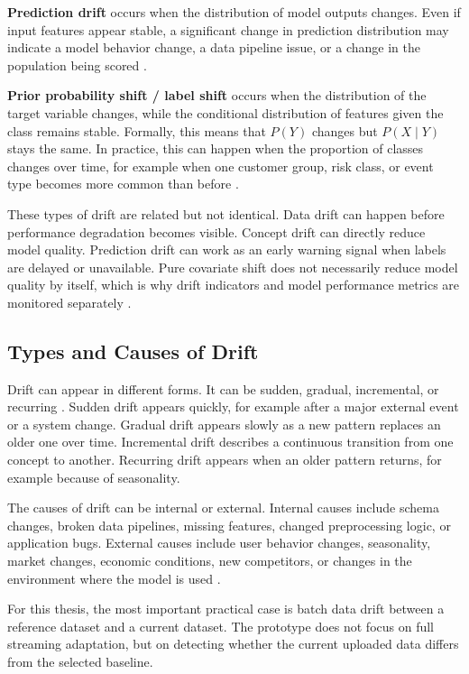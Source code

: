 \textbf{Prediction drift} occurs when the distribution of model outputs changes. Even if input features appear stable, a significant change in prediction distribution may indicate a model behavior change, a data pipeline issue, or a change in the population being scored \cite{MonitoringObservabilityMLSystems}.

\textbf{Prior probability shift / label shift} occurs when the distribution of the target variable changes, while the conditional distribution of features given the class remains stable. Formally, this means that $P(Y)$ changes but $P(X \mid Y)$ stays the same. In practice, this can happen when the proportion of classes changes over time, for example when one customer group, risk class, or event type becomes more common than before \cite{MorenoTorresDatasetShift2012}.

These types of drift are related but not identical. Data drift can happen before performance degradation becomes visible. Concept drift can directly reduce model quality. Prediction drift can work as an early warning signal when labels are delayed or unavailable. Pure covariate shift does not necessarily reduce model quality by itself, which is why drift indicators and model performance metrics are monitored separately \cite{MorenoTorresDatasetShift2012}.


\subsection{Types and Causes of Drift}

Drift can appear in different forms. It can be sudden, gradual, incremental, or recurring \cite{LearningUnderConceptDrift}. Sudden drift appears quickly, for example after a major external event or a system change. Gradual drift appears slowly as a new pattern replaces an older one over time. Incremental drift describes a continuous transition from one concept to another. Recurring drift appears when an older pattern returns, for example because of seasonality.

The causes of drift can be internal or external. Internal causes include schema changes, broken data pipelines, missing features, changed preprocessing logic, or application bugs. External causes include user behavior changes, seasonality, market changes, economic conditions, new competitors, or changes in the environment where the model is used \cite{MonitoringPerformance}.

For this thesis, the most important practical case is batch data drift between a reference dataset and a current dataset. The prototype does not focus on full streaming adaptation, but on detecting whether the current uploaded data differs from the selected baseline.

